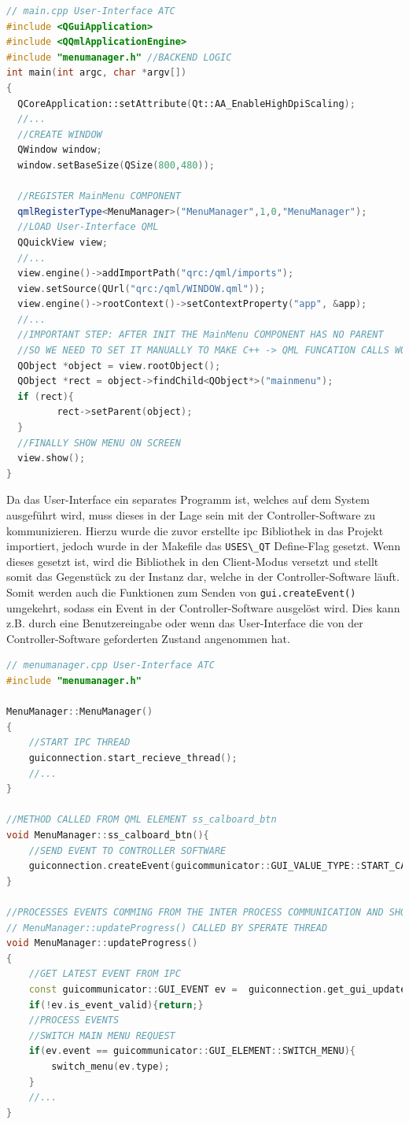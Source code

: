 \begin{lstlisting}[language={C++}]
// main.cpp User-Interface ATC
#include <QGuiApplication>
#include <QQmlApplicationEngine>
#include "menumanager.h" //BACKEND LOGIC
int main(int argc, char *argv[])
{
  QCoreApplication::setAttribute(Qt::AA_EnableHighDpiScaling);
  //...
  //CREATE WINDOW
  QWindow window;
  window.setBaseSize(QSize(800,480));

  //REGISTER MainMenu COMPONENT
  qmlRegisterType<MenuManager>("MenuManager",1,0,"MenuManager");
  //LOAD User-Interface QML
  QQuickView view;
  //...
  view.engine()->addImportPath("qrc:/qml/imports");
  view.setSource(QUrl("qrc:/qml/WINDOW.qml"));
  view.engine()->rootContext()->setContextProperty("app", &app);
  //...
  //IMPORTANT STEP: AFTER INIT THE MainMenu COMPONENT HAS NO PARENT
  //SO WE NEED TO SET IT MANUALLY TO MAKE C++ -> QML FUNCATION CALLS WORKING
  QObject *object = view.rootObject();
  QObject *rect = object->findChild<QObject*>("mainmenu");
  if (rect){
         rect->setParent(object);
  }
  //FINALLY SHOW MENU ON SCREEN
  view.show();
}
\end{lstlisting}

Da das User-Interface ein separates Programm ist, welches auf dem System
ausgeführt wird, muss dieses in der Lage sein mit der
Controller-Software zu kommunizieren. Hierzu wurde die zuvor erstellte
\gls{ipc} Bibliothek in das Projekt importiert, jedoch wurde in der
Makefile das \passthrough{\lstinline!USES\_QT!} Define-Flag gesetzt.
Wenn dieses gesetzt ist, wird die Bibliothek in den Client-Modus
versetzt und stellt somit das Gegenstück zu der Instanz dar, welche in
der Controller-Software läuft. Somit werden auch die Funktionen zum
Senden von \passthrough{\lstinline!gui.createEvent()!} umgekehrt, sodass
ein Event in der Controller-Software ausgelöst wird. Dies kann z.B.
durch eine Benutzereingabe oder wenn das User-Interface die von der
Controller-Software geforderten Zustand angenommen hat.

\begin{lstlisting}[language={C++}]
// menumanager.cpp User-Interface ATC
#include "menumanager.h"

MenuManager::MenuManager()
{
    //START IPC THREAD
    guiconnection.start_recieve_thread();
    //...
}

//METHOD CALLED FROM QML ELEMENT ss_calboard_btn
void MenuManager::ss_calboard_btn(){
    //SEND EVENT TO CONTROLLER SOFTWARE
    guiconnection.createEvent(guicommunicator::GUI_VALUE_TYPE::START_CALBOARD_PROC);
}

//PROCESSES EVENTS COMMING FROM THE INTER PROCESS COMMUNICATION AND SHOWS MENUS OR SET IMAGES/LABES
// MenuManager::updateProgress() CALLED BY SPERATE THREAD
void MenuManager::updateProgress()
{
    //GET LATEST EVENT FROM IPC
    const guicommunicator::GUI_EVENT ev =  guiconnection.get_gui_update_event();
    if(!ev.is_event_valid){return;}
    //PROCESS EVENTS
    //SWITCH MAIN MENU REQUEST
    if(ev.event == guicommunicator::GUI_ELEMENT::SWITCH_MENU){
        switch_menu(ev.type);
    }
    //...
}
\end{lstlisting}

